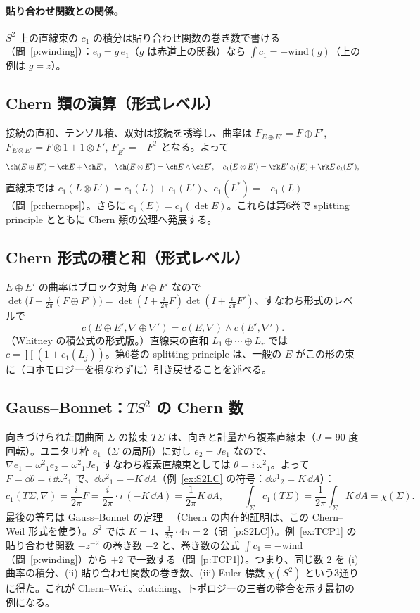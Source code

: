 \paragraph{貼り合わせ関数との関係。}$S^2$ 上の直線束の $c_1$ の積分は貼り合わせ関数の巻き数で書ける（問~\ref{p:winding}）：$e_0=g\,e_1$（$g$ は赤道上の関数）なら $\int c_1=-\mathrm{wind}(g)$（上の例は $g=z$）。

\subsection{Chern 類の演算（形式レベル）}
接続の直和、テンソル積、双対は接続を誘導し、曲率は $F_{E\oplus E'}=F\oplus F'$, $F_{E\otimes E'}=F\otimes1+1\otimes F'$, $F_{E^*}=-F^T$ となる。よって
\[
\ch(E\oplus E')=\ch E+\ch E',\quad\ch(E\otimes E')=\ch E\wedge\ch E',\quad c_1(E\otimes E')=\rk E'\,c_1(E)+\rk E\,c_1(E'),
\]
直線束では $c_1(L\otimes L')=c_1(L)+c_1(L')$、$c_1(L^*)=-c_1(L)$（問~\ref{p:chernops}）。さらに $c_1(E)=c_1(\det E)$。これらは第6巻で splitting principle とともに Chern 類の公理へ発展する。


\subsection{Chern 形式の積と和（形式レベル）}
$E\oplus E'$ の曲率はブロック対角 $F\oplus F'$ なので $\det\bigl(I+\frac i{2\pi}(F\oplus F')\bigr)=\det(I+\frac i{2\pi}F)\det(I+\frac i{2\pi}F')$、すなわち形式のレベルで
\[
c(E\oplus E',\nabla\oplus\nabla')=c(E,\nabla)\wedge c(E',\nabla').
\]
（Whitney の積公式の形式版。）直線束の直和 $L_1\oplus\cdots\oplus L_r$ では $c=\prod(1+c_1(L_j))$。第6巻の splitting principle は、一般の $E$ がこの形の束に（コホモロジーを損なわずに）引き戻せることを述べる。

\subsection{Gauss--Bonnet：$T S^2$ の Chern 数}
向きづけられた閉曲面 $\Sigma$ の接束 $T\Sigma$ は、向きと計量から複素直線束（$J$ = 90 度回転）。ユニタリ枠 $e_1$（$\Sigma$ の局所）に対し $e_2=Je_1$ なので、$\nabla e_1=\omega^2{}_1e_2=\omega^2{}_1Je_1$ すなわち複素直線束としては $\theta=i\,\omega^2{}_1$。よって $F=\dd\theta=i\,\dd\omega^2{}_1$ で、$\dd\omega^2{}_1=-K\,\dd A$（例~\ref{ex:S2LC} の符号：$\dd\omega^1{}_2=K\,\dd A$）：
\[
c_1(T\Sigma,\nabla)=\frac i{2\pi}F=\frac i{2\pi}\cdot i\,(-K\,\dd A)=\frac1{2\pi}K\,\dd A,\qquad\int_\Sigma c_1(T\Sigma)=\frac1{2\pi}\int_\Sigma K\,\dd A=\chi(\Sigma).
\]
最後の等号は Gauss--Bonnet の定理 \tC\ （Chern の内在的証明は、この Chern--Weil 形式を使う）。$S^2$ では $K=1$、$\frac1{2\pi}\cdot4\pi=2$（問~\ref{p:S2LC}）。例~\ref{ex:TCP1} の貼り合わせ関数 $-z^{-2}$ の巻き数 $-2$ と、巻き数の公式 $\int c_1=-\mathrm{wind}$（問~\ref{p:winding}）から $+2$ で一致する（問~\ref{p:TCP1}）。つまり、同じ数 $2$ を (i) 曲率の積分、(ii) 貼り合わせ関数の巻き数、(iii) Euler 標数 $\chi(S^2)$ という3通りに得た。これが Chern--Weil、clutching、トポロジーの三者の整合を示す最初の例になる。


